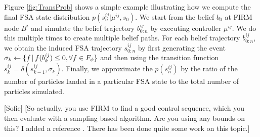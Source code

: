 \documentclass[conference]{IEEEtran}
\newcommand{\sofie}[1]{{\color{purple} [Sofie] #1}}
\begin{document}
Figure \ref{fig:TransProb} shows a simple example illustrating how we compute the final FSA state distribution $p(s^{ij}_n|\mu^{ij},s_0)$.
We start from the belief $b_0$ at FIRM node $B^i$ and simulate the belief trajectory $b^{ij}_{0:n}$ by executing controller $\mu^{ij}$. We do this multiple times to create multiple belief paths. For each belief trajectory $b^{ij}_{0:n}$, we obtain the induced FSA trajectory $s^{ij}_{0:n}$ by first generating the event $\sigma_k \leftarrow \{ f \,|\, f(b^{ij}_k) \leq 0, \forall f \in F_\phi \}$ and then using the transition function $s^{ij}_{k} = \delta(s^{ij}_{k-1},\sigma_k)$. Finally, we approximate the $p(s^{ij}_n)$ by the ratio of the number of particles landed in a particular FSA state to the total number of particles simulated.

\sofie{[So actually, you use FIRM to find a good control sequence, which you then evaluate with a sampling based algorithm. Are you using any bounds on this? I added a reference \cite{Legay2010}. There has been done quite some work on this topic.]}







\end{document}
